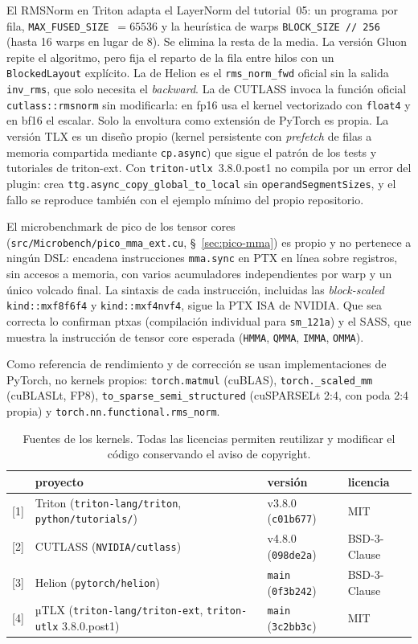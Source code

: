 El RMSNorm en Triton adapta el LayerNorm del tutorial~05: un programa por fila,
\texttt{MAX\_FUSED\_SIZE}~$=65536$ y la heurística de warps \texttt{BLOCK\_SIZE // 256}
(hasta 16 warps en lugar de 8). Se elimina la resta de la media. La versión Gluon repite
el algoritmo, pero fija el reparto de la fila entre hilos con un \texttt{BlockedLayout}
explícito. La de Helion es el \texttt{rms\_norm\_fwd} oficial sin la salida
\texttt{inv\_rms}, que solo necesita el \emph{backward}. La de CUTLASS invoca la función
oficial \texttt{cutlass::rmsnorm} sin modificarla: en fp16 usa el kernel vectorizado con
\texttt{float4} y en bf16 el escalar. Solo la envoltura como extensión de PyTorch es
propia. La versión TLX es un diseño propio (kernel persistente con \emph{prefetch} de
filas a memoria compartida mediante \texttt{cp.async}) que sigue el patrón de los tests y
tutoriales de triton-ext. Con \texttt{triton-utlx}~3.8.0.post1 no compila por un error del
plugin: crea \texttt{ttg.async\_copy\_global\_to\_local} sin \texttt{operandSegmentSizes},
y el fallo se reproduce también con el ejemplo mínimo del propio repositorio.

El microbenchmark de pico de los tensor cores (\texttt{src/Microbench/pico\_mma\_ext.cu},
§~\ref{sec:pico-mma}) es propio y no pertenece a ningún DSL: encadena instrucciones
\texttt{mma.sync} en PTX en línea sobre registros, sin accesos a memoria, con varios
acumuladores independientes por warp y un único volcado final. La sintaxis de cada
instrucción, incluidas las \emph{block-scaled} \texttt{kind::mxf8f6f4} y
\texttt{kind::mxf4nvf4}, sigue la PTX ISA de NVIDIA. Que sea correcta lo confirman ptxas
(compilación individual para \texttt{sm\_121a}) y el SASS, que muestra la instrucción de
tensor core esperada (\texttt{HMMA}, \texttt{QMMA}, \texttt{IMMA}, \texttt{OMMA}).

Como referencia de rendimiento y de corrección se usan implementaciones de PyTorch, no
kernels propios: \texttt{torch.matmul} (cuBLAS), \texttt{torch.\_scaled\_mm} (cuBLASLt,
FP8), \texttt{to\_sparse\_semi\_structured} (cuSPARSELt 2:4, con poda 2:4 propia) y
\texttt{torch.nn.functional.rms\_norm}.

\begin{table}[htbp]
  \centering\small
  \begin{tabularx}{\linewidth}{lXll}
    \toprule
    & proyecto & versión & licencia \\
    \midrule
    {[1]} & Triton (\texttt{triton-lang/triton}, \texttt{python/tutorials/}) & v3.8.0 (\texttt{c01b677}) & MIT \\
    {[2]} & CUTLASS (\texttt{NVIDIA/cutlass}) & v4.8.0 (\texttt{098de2a}) & BSD-3-Clause \\
    {[3]} & Helion (\texttt{pytorch/helion}) & \texttt{main} (\texttt{0f3b242}) & BSD-3-Clause \\
    {[4]} & µTLX (\texttt{triton-lang/triton-ext}, \texttt{triton-utlx} 3.8.0.post1) & \texttt{main} (\texttt{3c2bb3c}) & MIT \\
    \bottomrule
  \end{tabularx}
  \caption{Fuentes de los kernels. Todas las licencias permiten reutilizar y modificar el código conservando el aviso de copyright.}
  \label{tab:fuentes}
\end{table}
